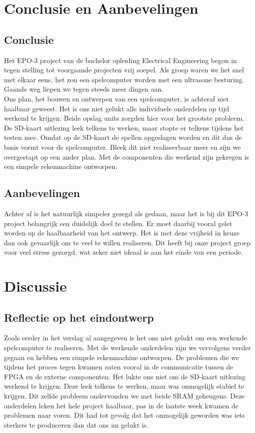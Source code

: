 \documentclass[oneside,dutch]{tudelft-report}
\begin{document}
\chapter{Conclusie en Aanbevelingen}
\section{Conclusie}
Het EPO-3 project van de bachelor opleiding Electrical Engineering begon in tegen stelling tot voorgaande projecten vrij soepel. Als groep waren we het snel met elkaar eens, het zou een spelcomputer worden met een ultrasone besturing. Gaande weg liepen we tegen steeds meer dingen aan. \\

Ons plan, het bouwen en ontwerpen van een spelcomputer, is achteraf niet haalbaar geweest. Het is ons niet gelukt alle individuele onderdelen op tijd werkend te krijgen. Beide opslag units zorgden hier voor het grootste probleem. De SD-kaart uitlezing leek telkens te werken, maar stopte er telkens tijdens het testen mee. Omdat op de SD-kaart de spellen opgeslagen worden en dit dus de basis vormt voor de spelcomputer. Bleek dit niet realiseerbaar meer en zijn we overgestapt op een ander plan. Met de componenten die werkend zijn gekregen is een simpele rekenmachine ontworpen. 

\section{Aanbevelingen}
Achter af is het natuurlijk simpeler gezegd als gedaan, maar het is bij dit EPO-3 project belangrijk een duidelijk doel te stellen. Er moet daarbij vooral gelet worden op de haalbaarheid van het ontwerp. Het is met deze vrijheid in keuze dan ook gevaarlijk om te veel te willen realiseren. Dit heeft bij onze project groep voor veel stress gezorgd, wat zeker niet ideaal is aan het einde van een periode. 

\chapter{Discussie}
\section{Reflectie op het eindontwerp}
Zoals eerder in het verslag al aangegeven is het ons niet gelukt om een werkende spelcomputer te realiseren. Met de werkende onderdelen zijn we vervolgens verder gegaan en hebben een simpele rekenmachine ontworpen. De problemen die we tijdens het proces tegen kwamen zaten vooral in de communicatie tussen de FPGA en de externe componenten. Het lukte ons niet om de SD-kaart uitlezing werkend te krijgen. Deze leek telkens te werken, maar was onmogelijk stabiel te krijgen. Dit zelfde probleem ondervonden we met beide SRAM geheugens. Deze onderdelen leken het hele project haalbaar, pas in de laatste week kwamen de problemen naar voren. Dit had tot gevolg dat het onmogelijk geworden was iets sterkers te produceren dan dat ons nu gelukt is. 
\end{document}
